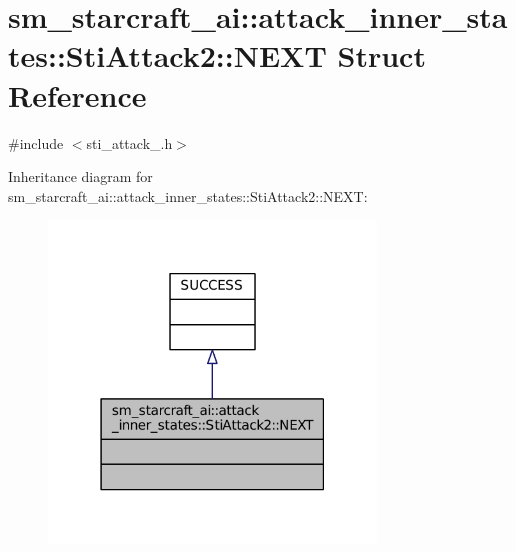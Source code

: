 \hypertarget{structsm__starcraft__ai_1_1attack__inner__states_1_1StiAttack2_1_1NEXT}{}\section{sm\+\_\+starcraft\+\_\+ai\+:\+:attack\+\_\+inner\+\_\+states\+:\+:Sti\+Attack2\+:\+:N\+E\+XT Struct Reference}
\label{structsm__starcraft__ai_1_1attack__inner__states_1_1StiAttack2_1_1NEXT}


{\ttfamily \#include $<$sti\+\_\+attack\+\_.\+h$>$}



Inheritance diagram for sm\+\_\+starcraft\+\_\+ai\+:\+:attack\+\_\+inner\+\_\+states\+:\+:Sti\+Attack2\+:\+:N\+E\+XT\+:
\nopagebreak
\begin{figure}[H]
\begin{center}
\leavevmode
\includegraphics[width=247pt]{structsm__starcraft__ai_1_1attack__inner__states_1_1StiAttack2_1_1NEXT__inherit__graph}
\end{center}
\end{figure}


